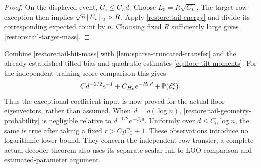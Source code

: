 \begin{proof}
On the displayed event, $G_i\le C_Ld$.
Choose $L_0=R\sqrt{C_L}$.
The target-row exception then implies
$\sqrt n\left\lVert U_{i\cdot}\right\rVert_2>R$.
Apply \eqref{restore:tail-energy} and divide its corresponding
expected count by $n$.  Choosing fixed $R$ sufficiently large gives
\eqref{restore:tail-target-mass}.
\end{proof}

\begin{remark}
\label{restore:tail-scope}
Combine \eqref{restore:tail-hit-mass} with
\cref{lem:sparse-truncated-transfer} and the already established
tilted bias and quadratic estimates
\eqref{eq:floor-tilt-moments}.
For the independent training-score comparison this gives
\[
 C d^{-1/2}e^{-I}+C_{H_0}e^{-H_0d}+\mathbb P(\mathcal E_r^c).
\]
Thus the exceptional-coefficient input is now proved for the actual
floor eigenvectors, rather than assumed.
When $d=o(\log n)$, \eqref{restore:tail-geometry-probability} is
negligible relative to $d^{-1/2}e^{-C_Id}$.
Uniformly over $d\le C_0\log n$, the same is true after taking a
fixed $r>C_IC_0+1$.
These observations introduce no logarithmic lower bound.
They concern the independent-row transfer; a complete actual-decoder
theorem also uses its separate scalar full-to-LOO comparison and
estimated-parameter argument.
\end{remark}
